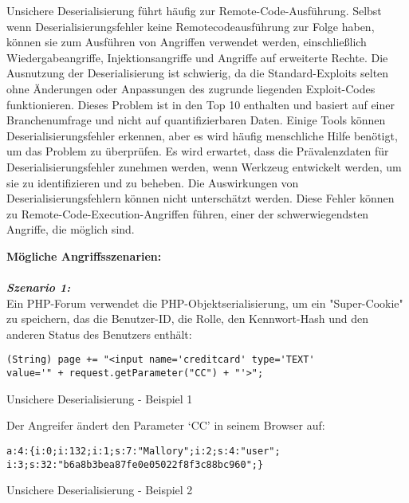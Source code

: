 Unsichere Deserialisierung führt häufig zur Remote-Code-Ausführung. Selbst wenn Deserialisierungsfehler keine Remotecodeausführung zur Folge haben, können sie zum Ausführen von Angriffen verwendet werden, einschließlich Wiedergabeangriffe, Injektionsangriffe und Angriffe auf erweiterte Rechte\cite[6]{owasp17top10}. Die Ausnutzung der Deserialisierung ist schwierig, da die Standard-Exploits selten ohne Änderungen oder Anpassungen des zugrunde liegenden Exploit-Codes funktionieren. Dieses Problem ist in den Top 10 enthalten und basiert auf einer Branchenumfrage und nicht auf quantifizierbaren Daten. Einige Tools können Deserialisierungsfehler erkennen, aber es wird häufig menschliche Hilfe benötigt, um das Problem zu überprüfen. Es wird erwartet, dass die Prävalenzdaten für Deserialisierungsfehler zunehmen werden, wenn Werkzeug entwickelt werden, um sie zu identifizieren und zu beheben. Die Auswirkungen von Deserialisierungsfehlern können nicht unterschätzt werden. Diese Fehler können zu Remote-Code-Execution-Angriffen führen, einer der schwerwiegendsten Angriffe, die möglich sind\cite[13]{owasp17top10}.

\textbf{Mögliche Angriffsszenarien:}\\
\\
\textbf{\textit{Szenario 1:}}\\

Ein PHP-Forum verwendet die PHP-Objektserialisierung, um ein "Super-Cookie" zu speichern, das die Benutzer-ID, die Rolle, den Kennwort-Hash und den anderen Status des Benutzers enthält\cite[13]{owasp17top10}:

\begin{Listing}[h]
	\begin{lstlisting}
(String) page += "<input name='creditcard' type='TEXT'
value='" + request.getParameter("CC") + "'>";
	\end{lstlisting}
	\caption{Unsichere Deserialisierung - Beispiel 1}
	\label{lst:ud1}
\end{Listing}

Der Angreifer ändert den Parameter ‘CC’ in seinem Browser auf:

\begin{Listing}[h]
	\begin{lstlisting}
a:4:{i:0;i:132;i:1;s:7:"Mallory";i:2;s:4:"user";
i:3;s:32:"b6a8b3bea87fe0e05022f8f3c88bc960";}
	\end{lstlisting}
	\caption{Unsichere Deserialisierung - Beispiel 2}
	\label{lst:ud2}
\end{Listing}
\newpage

